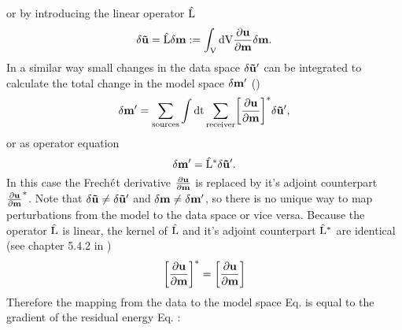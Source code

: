 or by introducing the linear operator $\rm{\hat{L}}$
\begin{equation}
\rm{\delta \mathbf{\tilde{u}} = \hat{L} \delta \mathbf{m} := \int_V dV \frac{\partial \mathbf{u}}{\partial \mathbf{m}} \delta 
\mathbf{m}.\notag}
\label{2:4:1}
\end{equation} 
In a similar way small changes in the data space $\rm{\delta \mathbf{\tilde{u}}'}$ can be integrated to calculate the total change in the model 
space $\rm{\delta \mathbf{m}'}$ (\cite{tarantola:2005})
\begin{equation}
\rm{\delta \mathbf{m'} =  \sum_{sources} \int dt \sum_{receiver} \biggl[\frac{\partial \mathbf{u}}{\partial \mathbf{m}}\biggr]^* \delta
\mathbf{\tilde{u}}',}
\label{3:6}
\end{equation}
or as operator equation
\begin{equation}
\rm{\delta \mathbf{m'} = \hat{L}^* \delta \mathbf{\tilde{u}}'. \notag}
\label{3:6:1}
\end{equation}
In this case the Frech$\rm{\acute{e}}$t derivative $\rm{\frac{\partial \mathbf{u}}{\partial \mathbf{m}}}$ is replaced by it's adjoint 
counterpart $\rm{\frac{\partial \mathbf{u}}{\partial \mathbf{m}}^*}$. Note that $\rm{\delta
\mathbf{\tilde{u}} \ne \delta \mathbf{\tilde{u}}'}$ and $\rm{\delta \mathbf{m} \ne \delta \mathbf{m}'}$, so there is no unique way to map perturbations from the model to the data space or vice versa. Because the operator $\rm{\hat{L}}$ is linear, the kernel of $\rm{\hat{L}}$ and it's adjoint counterpart $\rm{\hat{L}^*}$ are identical (see chapter 5.4.2 in \cite{tarantola:2005})
\begin{equation}
\rm{\biggl[\frac{\partial \mathbf{u}}{\partial \mathbf{m}}\biggr]^* = \biggl[\frac{\partial \mathbf{u}}{\partial \mathbf{m}}\biggr]} \notag
\end{equation}
Therefore the mapping from the data to the model space Eq.  is equal to the gradient of the residual energy Eq. : 

